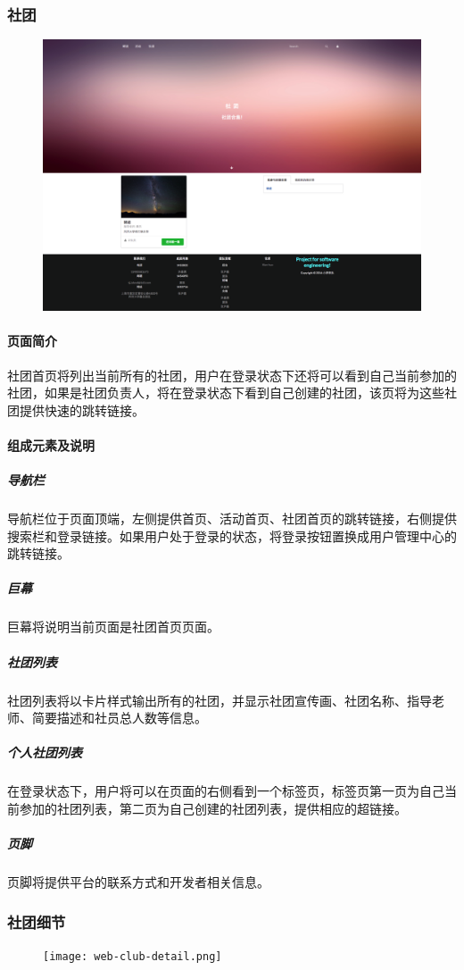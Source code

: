 \documentclass[UTF8]{ctexart}
\begin{document}
\subsubsection{社团}
\begin{figure}[H]
\centering
\includegraphics[width = .9\textwidth]{web-club-home.png}
\end{figure}
\paragraph{页面简介}
社团首页将列出当前所有的社团，用户在登录状态下还将可以看到自己当前参加的社团，如果是社团负责人，将在登录状态下看到自己创建的社团，该页将为这些社团提供快速的跳转链接。

\paragraph{组成元素及说明}
\subparagraph*{导航栏}
导航栏位于页面顶端，左侧提供首页、活动首页、社团首页的跳转链接，右侧提供搜索栏和登录链接。如果用户处于登录的状态，将登录按钮置换成用户管理中心的跳转链接。
\subparagraph*{巨幕}
巨幕将说明当前页面是社团首页页面。
\subparagraph*{社团列表}
社团列表将以卡片样式输出所有的社团，并显示社团宣传画、社团名称、指导老师、简要描述和社员总人数等信息。
\subparagraph*{个人社团列表}
在登录状态下，用户将可以在页面的右侧看到一个标签页，标签页第一页为自己当前参加的社团列表，第二页为自己创建的社团列表，提供相应的超链接。
\subparagraph*{页脚}
页脚将提供平台的联系方式和开发者相关信息。

\subsubsection{社团细节}
\begin{figure}[H]
\centering
\texttt{[image: web-club-detail.png]}
\end{figure}
\end{document}
